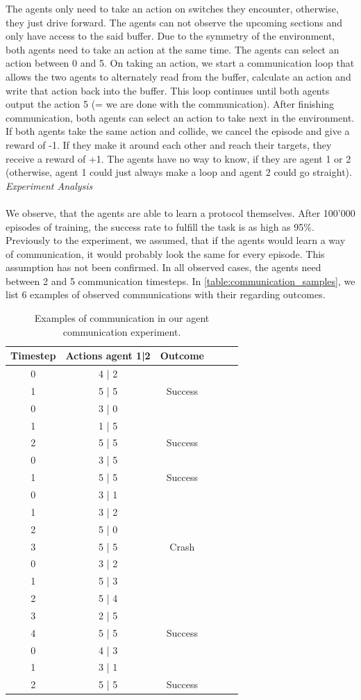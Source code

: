 The agents only need to take an action on switches they encounter, otherwise, they just drive forward. The agents can not observe the upcoming sections and only have access to the said buffer. Due to the symmetry of the environment, both agents need to take an action at the same time. The agents can select an action between 0 and 5. On taking an action, we start a communication loop that allows the two agents to alternately read from the buffer, calculate an action and write that action back into the buffer. This loop continues until both agents output the action 5 (= we are done with the communication). After finishing communication, both agents can select an action to take next in the environment. If both agents take the same action and collide, we cancel the episode and give a reward of -1. If they make it around each other and reach their targets, they receive a reward of +1. The agents have no way to know, if they are agent 1 or 2 (otherwise, agent 1 could just always make a loop and agent 2 could go straight).\newpage
\textit{Experiment Analysis}\\\\
We observe, that the agents are able to learn a protocol themselves. After 100'000 episodes of training, the success rate to fulfill the task is as high as 95\%. Previously to the experiment, we assumed, that if the agents would learn a way of communication, it would probably look the same for every episode. This assumption has not been confirmed. In all observed cases, the agents need between 2 and 5 communication timesteps. In \autoref{table:communication_samples}, we list 6 examples of observed communications with their regarding outcomes.
\begin{table}[H]
	\centering
	\begin{tabular}{ |c|c|c|c|c|c| } 
		\hline
		\textbf{Timestep} 
		& \textbf{Actions agent 1|2} 
		& \textbf{Outcome}\\
		\hline
		0 & 4 | 2 &\\
		1 & 5 | 5 & Success\\
		\hline
		0 & 3 | 0 &\\
		1 & 1 | 5 &\\
		2 & 5 | 5 & Success\\
		\hline
		0 & 3 | 5 &\\
		1 & 5 | 5 & Success\\
		\hline
		0 & 3 | 1 &\\
		1 & 3 | 2 &\\
		2 & 5 | 0 &\\
		3 & 5 | 5 & Crash\\
		\hline
		0 & 3 | 2 &\\
		1 & 5 | 3 &\\
		2 & 5 | 4 &\\
		3 & 2 | 5 &\\
		4 & 5 | 5 & Success\\
		\hline
		0 & 4 | 3 &\\
		1 & 3 | 1 &\\
		2 & 5 | 5 & Success\\
		\hline
	\end{tabular}
	\caption{Examples of communication in our agent communication experiment.}
	\label{table:communication_samples}
\end{table}
